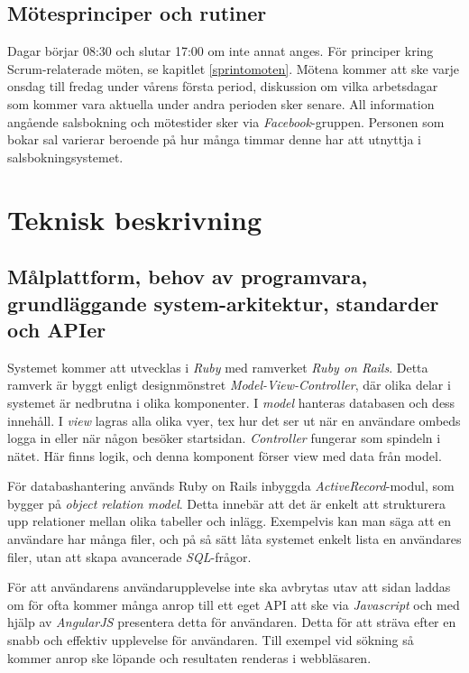 \documentclass[a4paper,12pt,oneside,final]{extbook}
\begin{document}
  \section{Mötesprinciper och rutiner}
  Dagar börjar 08:30 och slutar 17:00 om inte annat anges. För
  principer kring Scrum-relaterade möten, se kapitlet \ref{sprintomoten}.
  Mötena kommer att ske varje onsdag till fredag under vårens första period,
  diskussion om vilka arbetsdagar som kommer vara aktuella under andra
  perioden sker senare. All information angående salsbokning och mötestider
  sker via \emph{Facebook}-gruppen. Personen som bokar sal varierar beroende på hur
  många timmar denne har att utnyttja i salsbokningsystemet.

\chapter{Teknisk beskrivning}
\section{Målplattform, behov av programvara, grundläggande system-arkitektur, standarder och APIer}
Systemet kommer att utvecklas i \emph{Ruby} med ramverket \emph{Ruby on Rails}.
Detta ramverk är byggt enligt designmönstret \emph{Model-View-Controller}, där
olika delar i systemet är nedbrutna i olika komponenter. I \emph{model} hanteras
databasen och dess innehåll. I \emph{view} lagras alla olika vyer, tex hur det
ser ut när en användare ombeds logga in eller när någon besöker startsidan.
\emph{Controller} fungerar som spindeln i nätet. Här finns logik, och denna
komponent förser view med data från model.

För databashantering används Ruby on Rails inbyggda \emph{ActiveRecord}-modul,
som bygger på \emph{object relation model}. Detta innebär att det är enkelt
att strukturera upp relationer mellan olika tabeller och inlägg. Exempelvis
kan man säga att en användare har många filer, och på så sätt låta systemet
enkelt lista en användares filer, utan att skapa avancerade \emph{SQL}-frågor.

För att användarens användarupplevelse inte ska avbrytas utav att sidan laddas
om för ofta kommer många anrop till ett eget API att ske via \emph{Javascript} och med
hjälp av \emph{AngularJS} presentera detta för användaren. Detta för att sträva efter
en snabb och effektiv upplevelse för användaren. Till exempel vid sökning så
kommer anrop ske löpande och resultaten renderas i webbläsaren.
\end{document}

